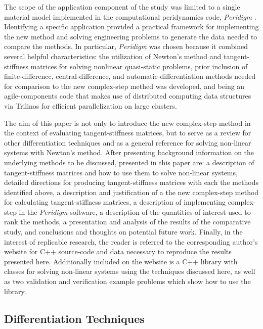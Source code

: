 \documentclass[preprint,12pt]{elsarticle}
\begin{document}
The scope of the application component of the study was limited to a single material model implemented in the computational peridynamics code, \textit{Peridigm} \cite{peridigm}. Identifying a specific application provided a practical framework for implementing the new method and solving engineering problems to generate the data needed to compare the methods. In particular, \emph{Peridigm} was chosen because it combined several helpful characteristics: the utilization of Newton's method and tangent-stiffness matrices for solving nonlinear quasi-static problems, prior inclusion of finite-difference, central-difference, and automatic-differentiation methods needed for comparison to the new complex-step methed was developed, and being an agile-components code that makes use of distributed computing data structures via Trilinos \cite{trilinos} for efficient parallelization on large clusters.

The aim of this paper is not only to introduce the new complex-step method in the context of evaluating tangent-stiffness matrices, but to serve as a review for other differentiation techniques and as a general reference for solving non-linear systems with Newton's method. After presenting background information on the underlying methods to be discussed, presented in this paper are: a description of tangent-stiffness matrices and how to use them to solve non-linear systems, detailed directions for producing tangent-stiffness matrices with each the methods identified above, a description and justification of a the new complex-step method for calculating tangent-stiffness matrices, a description of implementing complex-step in the \emph{Peridigm} software, a description of the quantities-of-interest used to rank the methods, a presentation and analysis of the results of the comparative study, and conclusions and thoughts on potential future work. Finally, in the interest of replicable research, the reader is referred to the corresponding author's website for C++ source-code and data necessary to reproduce the results presented here. Additionally included on the website is a C++ library with classes for solving non-linear systems using the techniques discussed here, as well as two validation and verification example problems which show how to use the library.

\subsection{Differentiation Techniques}
\end{document}
